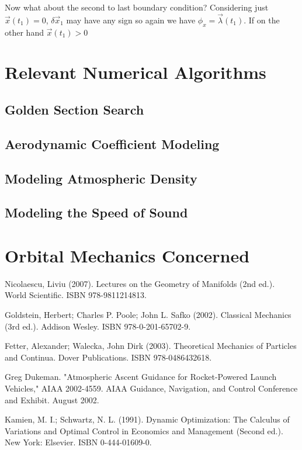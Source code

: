 \documentclass[11pt]{article}
\numberwithin{equation}{section}
\begin{document}
Now what about the second to last boundary condition? Considering just $\vec{x}(t_1) = 0$, $\delta\vec{x}_1$ may have any sign so again we have $\phi_x = \vec{\lambda}(t_1)$. If on the other hand $\vec{x}(t_1) > 0$

\section{Relevant Numerical Algorithms}

\subsection{Golden Section Search}

\subsection{Aerodynamic Coefficient Modeling}

\subsection{Modeling Atmospheric Density}

\subsection{Modeling the Speed of Sound}



\section{Orbital Mechanics Concerned}





\begin{thebibliography}{99}

  Nicolaescu, Liviu (2007). Lectures on the Geometry of Manifolds (2nd ed.). World Scientific. ISBN 978-9811214813. 
  
  Goldstein, Herbert; Charles P. Poole; John L. Safko (2002). Classical Mechanics (3rd ed.). Addison Wesley. ISBN 978-0-201-65702-9.
  
  Fetter, Alexander; Walecka, John Dirk (2003). Theoretical Mechanics of Particles and Continua. Dover Publications. ISBN 978-0486432618.

  Greg Dukeman. "Atmospheric Ascent Guidance for Rocket-Powered Launch Vehicles," AIAA 2002-4559. AIAA Guidance, Navigation, and Control Conference and Exhibit. August 2002. 
  
  Kamien, M. I.; Schwartz, N. L. (1991). Dynamic Optimization: The Calculus of Variations and Optimal Control in Economics and Management (Second ed.). New York: Elsevier. ISBN 0-444-01609-0.
  

\end{thebibliography}
\end{document}

